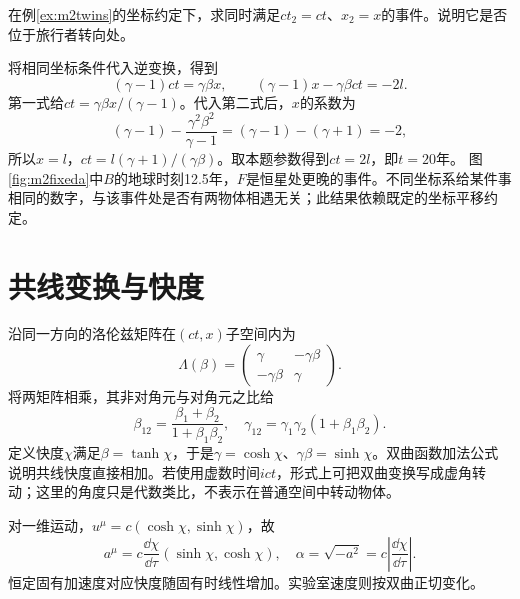 \begin{example}\label{ex:m2fixed}
在例\ref{ex:m2twins}的坐标约定下，求同时满足$ct_2=ct$、$x_2=x$的事件。说明它是否位于旅行者转向处。
\end{example}
\begin{solution}
将相同坐标条件代入逆变换，得到
\[
 (\gamma-1)ct=\gamma\beta x,
 \qquad(\gamma-1)x-\gamma\beta ct=-2l.
\]
第一式给$ct=\gamma\beta x/(\gamma-1)$。代入第二式后，$x$的系数为
\[
 (\gamma-1)-\frac{\gamma^2\beta^2}{\gamma-1}
 =(\gamma-1)-(\gamma+1)=-2,
\]
所以$x=l$，$ct=l(\gamma+1)/(\gamma\beta)$。取本题参数得到$ct=2l$，即$t=20$年。
图\ref{fig:m2fixeda}中$B$的地球时刻12.5年，$F$是恒星处更晚的事件。不同坐标系给某件事相同的数字，与该事件处是否有两物体相遇无关；此结果依赖既定的坐标平移约定。
\end{solution}

\section{共线变换与快度}\label{th:m2rapidity}
沿同一方向的洛伦兹矩阵在$(ct,x)$子空间内为
\[
 \Lambda(\beta)=\begin{pmatrix}\gamma&-\gamma\beta\\-\gamma\beta&\gamma\end{pmatrix}.
\]
将两矩阵相乘，其非对角元与对角元之比给
\[
 \beta_{12}=\frac{\beta_1+\beta_2}{1+\beta_1\beta_2},\quad
 \gamma_{12}=\gamma_1\gamma_2(1+\beta_1\beta_2).
\]
定义快度$\chi$满足$\beta=\tanh\chi$，于是$\gamma=\cosh\chi$、$\gamma\beta=\sinh\chi$。双曲函数加法公式说明共线快度直接相加。若使用虚数时间$ict$，形式上可把双曲变换写成虚角转动；这里的角度只是代数类比，不表示在普通空间中转动物体。

对一维运动，$u^\mu=c(\cosh\chi,\sinh\chi)$，故
\[
 a^\mu=c\frac{\dd\chi}{\dd\tau}(\sinh\chi,\cosh\chi),\quad
 \alpha=\sqrt{-a^2}=c\left|\frac{\dd\chi}{\dd\tau}\right|.
\]
恒定固有加速度对应快度随固有时线性增加。实验室速度则按双曲正切变化。


